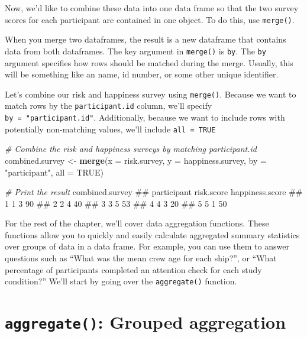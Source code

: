 \documentclass[]{book}
\newenvironment{Shaded}{\begin{snugshade}}{\end{snugshade}}
\newcommand{\KeywordTok}[1]{\textcolor[rgb]{0.13,0.29,0.53}{\textbf{#1}}}
\newcommand{\DataTypeTok}[1]{\textcolor[rgb]{0.13,0.29,0.53}{#1}}
\newcommand{\StringTok}[1]{\textcolor[rgb]{0.31,0.60,0.02}{#1}}
\newcommand{\CommentTok}[1]{\textcolor[rgb]{0.56,0.35,0.01}{\textit{#1}}}
\newcommand{\OtherTok}[1]{\textcolor[rgb]{0.56,0.35,0.01}{#1}}
\newcommand{\NormalTok}[1]{#1}
\theoremstyle{definition}
\theoremstyle{definition}
\theoremstyle{remark}
\begin{document}
Now, we'd like to combine these data into one data frame so that the two
survey scores for each participant are contained in one object. To do
this, use \texttt{merge()}.

When you merge two dataframes, the result is a new dataframe that
contains data from both dataframes. The key argument in \texttt{merge()}
is \texttt{by}. The \texttt{by} argument specifies how rows should be
matched during the merge. Usually, this will be something like an name,
id number, or some other unique identifier.

Let's combine our risk and happiness survey using \texttt{merge()}.
Because we want to match rows by the \texttt{participant.id} column,
we'll specify \texttt{by\ =\ "participant.id"}. Additionally, because we
want to include rows with potentially non-matching values, we'll include
\texttt{all\ =\ TRUE}

\begin{Shaded}
\begin{Highlighting}[]
\CommentTok{# Combine the risk and happiness surveys by matching participant.id}
\NormalTok{combined.survey <-}\StringTok{ }\KeywordTok{merge}\NormalTok{(}\DataTypeTok{x =}\NormalTok{ risk.survey,}
                         \DataTypeTok{y =}\NormalTok{ happiness.survey,}
                         \DataTypeTok{by =} \StringTok{"participant"}\NormalTok{,}
                         \DataTypeTok{all =} \OtherTok{TRUE}\NormalTok{)}

\CommentTok{# Print the result}
\NormalTok{combined.survey}
\NormalTok{##   participant risk.score happiness.score}
\NormalTok{## 1           1          3              90}
\NormalTok{## 2           2          4              40}
\NormalTok{## 3           3          5              53}
\NormalTok{## 4           4          3              20}
\NormalTok{## 5           5          1              50}
\end{Highlighting}
\end{Shaded}

For the rest of the chapter, we'll cover data aggregation functions.
These functions allow you to quickly and easily calculate aggregated
summary statistics over groups of data in a data frame. For example, you
can use them to answer questions such as ``What was the mean crew age
for each ship?'', or ``What percentage of participants completed an
attention check for each study condition?'' We'll start by going over
the \texttt{aggregate()} function.

\section{\texorpdfstring{\texttt{aggregate()}: Grouped
aggregation}{aggregate(): Grouped aggregation}}\label{aggregate-grouped-aggregation}
\end{document}
